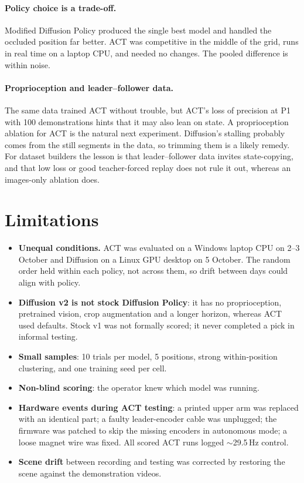 \documentclass[10pt,twocolumn,letterpaper]{article}
\begin{document}
\paragraph{Policy choice is a trade-off.} Modified Diffusion Policy produced the single best model
and handled the occluded position far better. ACT was competitive in the middle of the grid,
runs in real time on a laptop CPU, and needed no changes. The pooled difference is within noise.

\paragraph{Proprioception and leader--follower data.} The same data trained ACT without trouble,
but ACT's loss of precision at P1 with 100 demonstrations hints that it may also lean on state.
A proprioception ablation for ACT is the natural next experiment. Diffusion's stalling probably
comes from the still segments in the data, so trimming them is a likely remedy. For dataset
builders the lesson is that leader--follower data invites state-copying, and that low loss or good
teacher-forced replay does not rule it out, whereas an images-only ablation does.

\section{Limitations}

\begin{itemize}
  \item \textbf{Unequal conditions.} ACT was evaluated on a Windows laptop CPU on 2--3 October and
        Diffusion on a Linux GPU desktop on 5 October. The random order held within each policy,
        not across them, so drift between days could align with policy.
  \item \textbf{Diffusion v2 is not stock Diffusion Policy}: it has no proprioception, pretrained
        vision, crop augmentation and a longer horizon, whereas ACT used defaults. Stock v1 was not
        formally scored; it never completed a pick in informal testing.
  \item \textbf{Small samples}: 10 trials per model, 5 positions, strong within-position clustering,
        and one training seed per cell.
  \item \textbf{Non-blind scoring}: the operator knew which model was running.
  \item \textbf{Hardware events during ACT testing}: a printed upper arm was replaced with an
        identical part; a faulty leader-encoder cable was unplugged; the firmware was patched to
        skip the missing encoders in autonomous mode; a loose magnet wire was fixed. All scored ACT
        runs logged $\sim$29.5\,Hz control.
  \item \textbf{Scene drift} between recording and testing was corrected by restoring the scene
        against the demonstration videos.
\end{itemize}
\end{document}
